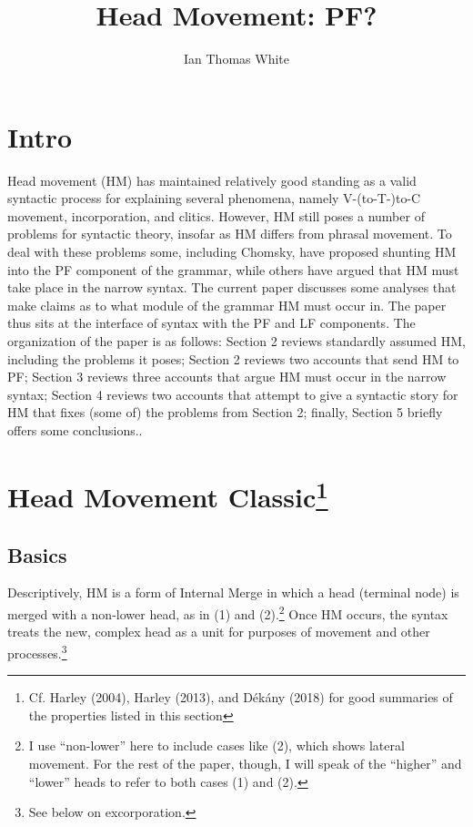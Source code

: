 \documentclass[]{ling-200b-2}
\title{Head Movement: PF?}
\author{Ian Thomas White}
\date{}
\makeatletter
\renewcommand{\maketitle}
{
\begin{flushleft}
\textbf{{\large\@title}}
\newline
\@author
\end{flushleft}
}
\makeatother
\begin{document}
\thispagestyle{empty}
\singlespacing
\maketitle
\tableofcontents
\newpage

\section{Intro}

Head movement (HM) has maintained relatively good standing as a valid syntactic process for explaining several phenomena, namely V-(to-T-)to-C movement, incorporation, and clitics. However, HM still poses a number of problems for syntactic theory, insofar as HM differs from phrasal movement. To deal with these problems some, including Chomsky, have proposed shunting HM into the PF component of the grammar, while others have argued that HM must take place in the narrow syntax. The current paper discusses some analyses that make claims as to what module of the grammar HM must occur in. The paper thus sits at the interface of syntax with the PF and LF components. The organization of the paper is as follows: Section 2 reviews standardly assumed HM, including the problems it poses; Section 2 reviews two accounts that send HM to PF; Section 3 reviews three accounts that argue HM must occur in the narrow syntax; Section 4 reviews two accounts that attempt to give a syntactic story for HM that fixes (some of) the problems from Section 2; finally, Section 5 briefly offers some conclusions..


\section[Head Movement Classic]{Head Movement Classic\footnote{Cf. Harley (2004), Harley (2013), and Dékány (2018) for good summaries of the properties listed in this section}}

\subsection{Basics}

Descriptively, HM is a form of Internal Merge in which a head (terminal node) is merged with a non-lower head, as in (1) and (2).\footnote{ I use ``non-lower'' here to include cases like (2), which shows lateral movement. For the rest of the paper, though, I will speak of the ``higher'' and ``lower'' heads to refer to both cases (1) and (2).} Once HM occurs, the syntax treats the new, complex head as a unit for purposes of movement and other processes.\footnote{See below on excorporation.}
\end{document}
